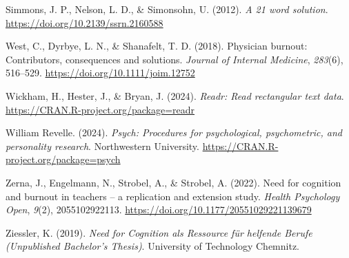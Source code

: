 \documentclass[
  man]{apa6}
\newlength{\cslhangindent}
\newenvironment{CSLReferences}[2] %
 {\begin{list}{}{%
  \setlength{\itemindent}{0pt}
  \setlength{\leftmargin}{0pt}
  \setlength{\parsep}{0pt}
  \ifodd #1
   \setlength{\leftmargin}{\cslhangindent}
   \setlength{\itemindent}{-1\cslhangindent}
  \fi
  \setlength{\itemsep}{#2\baselineskip}}}
 {\end{list}}
\begin{document}
\begin{CSLReferences}{1}{0}
Simmons, J. P., Nelson, L. D., \& Simonsohn, U. (2012). \emph{A 21 word solution}. \url{https://doi.org/10.2139/ssrn.2160588}

West, C., Dyrbye, L. N., \& Shanafelt, T. D. (2018). Physician burnout: Contributors, consequences and solutions. \emph{Journal of Internal Medicine}, \emph{283}(6), 516--529. \url{https://doi.org/10.1111/joim.12752}

Wickham, H., Hester, J., \& Bryan, J. (2024). \emph{Readr: Read rectangular text data}. \url{https://CRAN.R-project.org/package=readr}

William Revelle. (2024). \emph{Psych: Procedures for psychological, psychometric, and personality research}. Northwestern University. \url{https://CRAN.R-project.org/package=psych}

Zerna, J., Engelmann, N., Strobel, A., \& Strobel, A. (2022). Need for cognition and burnout in teachers -- a replication and extension study. \emph{Health Psychology Open}, \emph{9}(2), 2055102922113. \url{https://doi.org/10.1177/20551029221139679}

Ziessler, K. (2019). \emph{{Need for Cognition als Ressource für helfende Berufe} ({Unpublished Bachelor's Thesis})}. University of Technology Chemnitz.

\end{CSLReferences}
\end{document}
